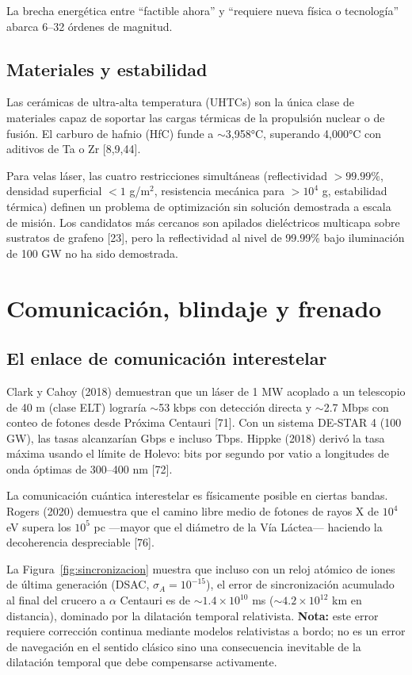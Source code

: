 \documentclass[11pt,a4paper,onecolumn]{article}
\begin{document}
La brecha energética entre ``factible ahora'' y ``requiere nueva física o tecnología'' abarca 6--32 órdenes de magnitud.

\subsection{Materiales y estabilidad}

Las cerámicas de ultra-alta temperatura (UHTCs) son la única clase de materiales capaz de soportar las cargas térmicas de la propulsión nuclear o de fusión. El carburo de hafnio (HfC) funde a $\sim$3,958°C, superando 4,000°C con aditivos de Ta o Zr [8,9,44].

Para velas láser, las cuatro restricciones simultáneas (reflectividad $>99.99\%$, densidad superficial $<1$ g/m$^2$, resistencia mecánica para $>10^4$ g, estabilidad térmica) definen un problema de optimización sin solución demostrada a escala de misión. Los candidatos más cercanos son apilados dieléctricos multicapa sobre sustratos de grafeno [23], pero la reflectividad al nivel de 99.99\% bajo iluminación de 100 GW no ha sido demostrada.

\section{Comunicación, blindaje y frenado}

\subsection{El enlace de comunicación interestelar}

Clark y Cahoy (2018) demuestran que un láser de 1 MW acoplado a un telescopio de 40 m (clase ELT) lograría $\sim$53 kbps con detección directa y $\sim$2.7 Mbps con conteo de fotones desde Próxima Centauri [71]. Con un sistema DE-STAR 4 (100 GW), las tasas alcanzarían Gbps e incluso Tbps. Hippke (2018) derivó la tasa máxima usando el límite de Holevo: bits por segundo por vatio a longitudes de onda óptimas de 300--400 nm [72].

La comunicación cuántica interestelar es físicamente posible en ciertas bandas. Rogers (2020) demuestra que el camino libre medio de fotones de rayos X de $10^4$ eV supera los $10^5$ pc —mayor que el diámetro de la Vía Láctea— haciendo la decoherencia despreciable [76].

La Figura~\ref{fig:sincronizacion} muestra que incluso con un reloj atómico de iones de última generación (DSAC, $\sigma_A=10^{-15}$), el error de sincronización acumulado al final del crucero a $\alpha$ Centauri es de $\sim1.4\times10^{10}$ ms ($\sim4.2\times10^{12}$ km en distancia), dominado por la dilatación temporal relativista. \textbf{Nota:} este error requiere corrección continua mediante modelos relativistas a bordo; no es un error de navegación en el sentido clásico sino una consecuencia inevitable de la dilatación temporal que debe compensarse activamente.
\end{document}
